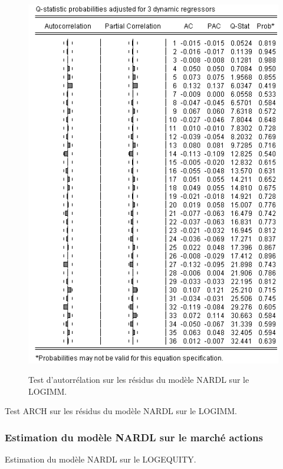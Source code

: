 \begin{figure}[H]
    \centering
    \caption{Test d'autorrélation sur les résidus du modèle NARDL sur le LOGIMM.}
    \includegraphics[scale=0.8]{annexes/correlogram_nardl_logimm.png}
    \label{fig:correlo_nardl_imm}
\end{figure}

\begin{table}[H]
    \centering
    \sffamily
    \caption{Test ARCH sur les résidus du modèle NARDL sur le LOGIMM.}
    \label{tab:arch_nardl_logimm}
    \resizebox{0.8\textwidth}{!}{}
\end{table}

\subsubsection{Estimation du modèle NARDL sur le marché actions}

\begin{table}[H]
    \centering
    \sffamily
    \caption{Estimation du modèle NARDL sur le LOGEQUITY.}
    \label{tab:nardl_logequity}
    \resizebox{0.8\textwidth}{!}{}
\end{table}

